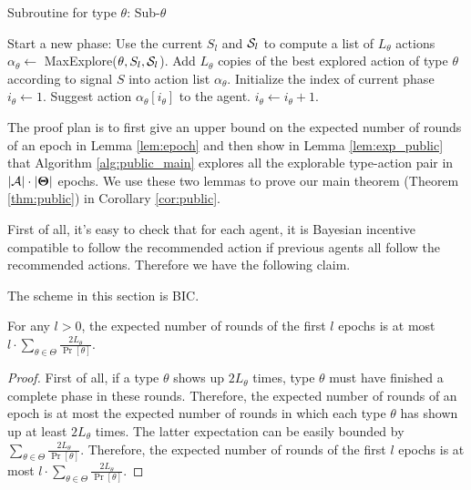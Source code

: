  \begin{algorithm}[H]
    \caption{Subroutine for type $\theta$: Sub-$\theta$ }
    	\label{alg:public_sub}
    \begin{algorithmic}[1]
			\STATE Start a new phase:
				\STATE Use the current $S_l$ and $\S_l$ to compute a list of $L_{\theta}$ actions $\alpha_{\theta} \leftarrow $ MaxExplore($\theta, S_l, \S_l$).
			\ELSE
				\STATE Add $L_{\theta}$ copies of the best explored action of type $\theta$ according to signal $S$ into action list $\alpha_{\theta}$.
			\ENDIF
			\STATE Initialize the index of current phase $i_{\theta} \leftarrow 1$.
		\ENDIF
		\STATE Suggest action $\alpha_{\theta} [i_{\theta}]$ to the agent.
		\STATE $i_{\theta} \leftarrow i_{\theta} + 1$.
	\ENDFOR
     \end{algorithmic}
\end{algorithm}


The proof plan is to first give an upper bound on the expected number of rounds of an epoch in Lemma \ref{lem:epoch} and then show in Lemma \ref{lem:exp_public} that Algorithm \ref{alg:public_main} explores all the explorable type-action pair in $|\A| \cdot |\varTheta|$ epochs. We use these two lemmas to prove our main theorem (Theorem \ref{thm:public}) in Corollary \ref{cor:public}.

First of all, it's easy to check that for each agent, it is Bayesian incentive compatible to follow the recommended action if previous agents all follow the recommended actions. Therefore we have the following claim.
\begin{claim}
\label{clm:public_BIC}
The scheme in this section is BIC.
\end{claim}

\begin{lemma}
\label{lem:epoch}
For any $l>0$, the expected number of rounds of the first $l$ epochs is at most $l \cdot \sum_{\theta\in\varTheta} \frac{2L_{\theta}}{\Pr[\theta]}$.
\end{lemma}

\begin{proof}
First of all, if a type $\theta$ shows up $2L_{\theta}$ times, type $\theta$ must have finished a complete phase in these rounds. Therefore, the expected number of rounds of an epoch is at most the expected number of rounds in which each type $\theta$ has shown up at least $2L_{\theta}$ times. The latter expectation can be easily bounded by $\sum_{\theta\in\varTheta} \frac{2L_{\theta}}{\Pr[\theta]}$. Therefore, the expected number of rounds of the first $l$ epochs is at most $l \cdot \sum_{\theta\in\varTheta} \frac{2L_{\theta}}{\Pr[\theta]}$.
\end{proof}

